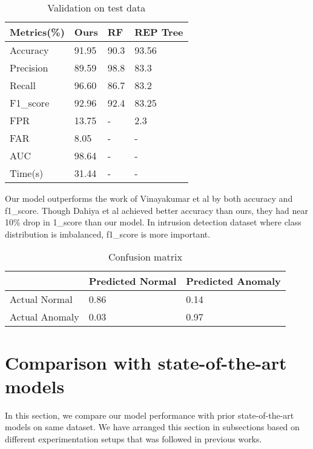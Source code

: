 \documentclass[14pt, conference]{IEEEtran}
\begin{document}
\begin{table}
\normalsize
\centering
\caption{Validation on test data}
\label{validationResult}
\renewcommand{\arraystretch}{1.2}
\begin{tabular}{|C{2cm}|C{1.2cm}|C{1.3cm}|C{1.7cm}|}
\hline
\textbf{Metrics(\%)} & \textbf{Ours} & \textbf{RF\cite{vinayakumar2019deep}} & \textbf{REP Tree\cite{dahiya2018network} }\\ \hline
Accuracy & 91.95 & 90.3 & 93.56 \\ \hline
Precision & 89.59 & 98.8 & 83.3\\ \hline
Recall  & 96.60 & 86.7 & 83.2 \\ \hline
F1\_score  & 92.96 & 92.4 & 83.25 \\ \hline
FPR & 13.75 & - & 2.3 \\ \hline
FAR & 8.05 & - &  - \\ \hline
AUC & 98.64 & - & - \\ \hline
Time(s) & 31.44 & - & - \\ \hline

\end{tabular}
\end{table}

Our model outperforms the work of Vinayakumar et al \cite{vinayakumar2019deep} by both accuracy and f1\_score.
Though Dahiya et al \cite{dahiya2018network} achieved better accuracy than ours, they had near 10\% drop in
1\_score than our model. In intrusion detection dataset where class distribution is imbalanced, f1\_score is more important.

\begin{table}
\normalsize
\centering
\caption{Confusion matrix}
\label{confusionMatrix}
\renewcommand{\arraystretch}{1.2}
\begin{tabular}{|C{2.4cm}|C{2.2cm}|C{2.2cm}|}
\hline
 & Predicted Normal & Predicted Anomaly \\ \hline
Actual Normal & 0.86 & 0.14 \\ \hline
Actual Anomaly & 0.03 & 0.97\\ \hline
\end{tabular}
\end{table}


\section{Comparison with state-of-the-art models} \label{comparison}
In this section, we compare our model performance with prior state-of-the-art models on same dataset. We have arranged this section in subsections based on different experimentation setups that was followed in previous works.
\end{document}
